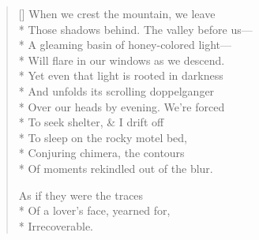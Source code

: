 \begin{verse}[\versewidth]
When we crest the mountain, we leave\\*
Those shadows behind. The valley before us---\\*
A gleaming basin of honey-colored light---\\*
Will flare in our windows as we descend.\\*
Yet even that light is rooted in darkness\\*
And unfolds its scrolling doppelganger\\*
Over our heads by evening. We're forced\\*
To seek shelter, \& I drift off\\*
To sleep on the rocky motel bed,\\*
Conjuring chimera, the contours\\*
Of moments rekindled out of the blur.

As if they were the traces\\*
Of a lover's face, yearned for,\\*
Irrecoverable.
\end{verse}
